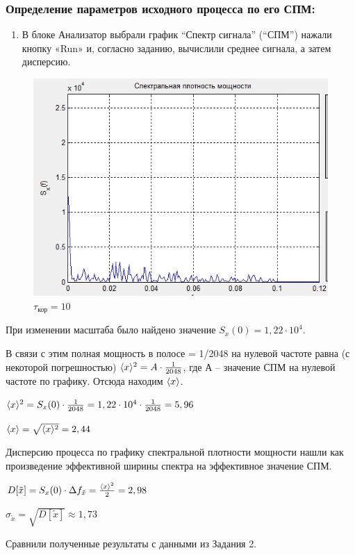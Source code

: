 \subsubsection[Задание 5.1]{Определение параметров исходного процесса по его СПМ:}
\begin{enumerate}
	\item В блоке Анализатор выбрали график “Спектр сигнала” (“СПМ”) нажали кнопку «Run» и, согласно заданию, вычислили среднее сигнала, а затем дисперсию.
\end{enumerate}
\begin{figure}[H]
	\centering
	\includegraphics[width=0.8\linewidth]{tasks/task5/realize1}
	\caption*{$\tau_\text{кор} = 10$}
\end{figure}	

При изменении масштаба было найдено значение $S_x(0)=1,22\cdot 10^4$.

В связи с этим полная мощность в полосе  = 1/2048 на нулевой частоте равна (с некоторой погрешностью) $\langle x\rangle^2 = A\cdot \frac{1}{2048}$, где $А$ – значение СПМ на нулевой частоте по графику. Отсюда находим $\langle x\rangle$.

$\langle x\rangle^2 = S_x(0)\cdot \frac{1}{2048}= 1,22\cdot 10^4\cdot \frac{1}{2048} = 5,96$

$\langle x\rangle =  \sqrt{\langle x\rangle^2} = 2,44$

Дисперсию процесса по графику спектральной плотности мощности нашли как произведение эффективной ширины спектра на эффективное значение СПМ.

$D[\tilde{x}] = S_x(0)\cdot \Delta f_{\tilde{x}} =\frac{\langle x\rangle^2}{2} = 2,98$

$\sigma_{\tilde{x}} = \sqrt{D[\tilde{x}]}\approx 1,73$

Сравнили полученные результаты с данными из Задания 2.
